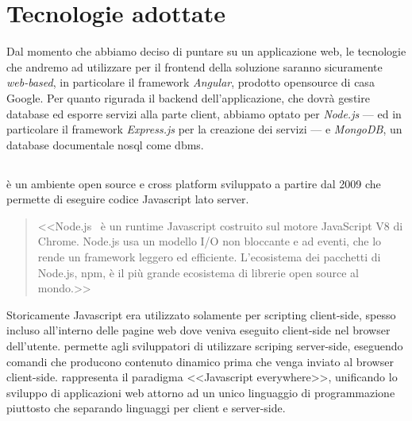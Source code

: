 \section{Tecnologie adottate}
Dal momento che abbiamo deciso di puntare su un applicazione web, le tecnologie che andremo ad utilizzare per il frontend della soluzione saranno sicuramente \textit{web-based}, in particolare il framework \textit{Angular}, prodotto opensource di casa Google. 
Per quanto rigurada il backend dell'applicazione, che dovrà gestire database ed esporre servizi alla parte client, abbiamo optato per \textit{Node.js} --- ed in particolare il framework \textit{Express.js} per la creazione dei servizi --- e \textit{MongoDB}, un database documentale \acrshort{nosql} come \acrshort{dbms}.

\subsection{\nodejs}
\nodejs è un ambiente open source e cross platform sviluppato a partire dal 2009 che permette di eseguire codice Javascript lato server.
\begin{quote}
	<<Node.js\textregistered ~ è un runtime Javascript costruito sul motore JavaScript V8 di Chrome. Node.js usa un modello I/O non bloccante e ad eventi, che lo rende un framework leggero ed efficiente. L'ecosistema dei pacchetti di Node.js, npm, è il più grande ecosistema di librerie open source al mondo.>> \cite{nodejs}
\end{quote}

Storicamente Javascript era utilizzato solamente per scripting client-side, spesso incluso all'interno delle pagine web dove veniva eseguito client-side nel browser dell'utente. \nodejs permette agli sviluppatori di utilizzare scriping server-side, eseguendo comandi che producono contenuto dinamico prima che venga inviato al browser client-side. \nodejs rappresenta il paradigma <<Javascript everywhere>>\cite{jseverywhere}, unificando lo sviluppo di applicazioni web attorno ad un unico linguaggio di programmazione piuttosto che separando  linguaggi per client e server-side.

